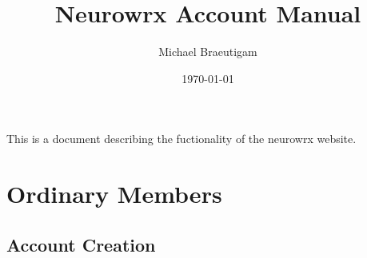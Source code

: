 \documentclass[10pt]{article}
\title{Neurowrx Account Manual}
\author{Michael Braeutigam}
\date{\today}
\begin{document}
\begin{titlepage}
\maketitle
\end{titlepage}

\linespread{1.15} %

\begin{executive}

This is a document describing the fuctionality of the neurowrx website.

\end{executive}

\tableofcontents


















\section{Ordinary Members}

\subsection{Account Creation}
\end{document}
